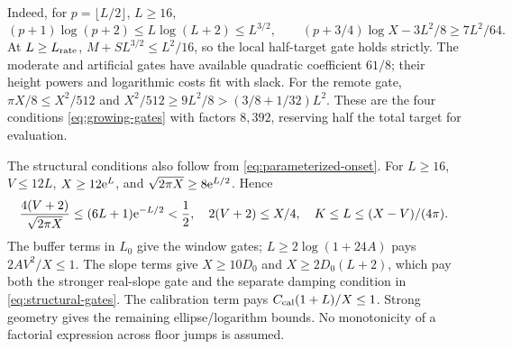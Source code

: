 Indeed, for \(p=\lfloor L/2\rfloor\), \(L\ge16\),
\[
 (p+1)\log(p+2)\le L\log(L+2)\le L^{3/2},\qquad
 (p+3/4)\log X-3L^2/8\ge7L^2/64.
\]
At \(L\ge L_{\rm rate}\), \(M+SL^{3/2}\le L^2/16\),
so the local half-target gate holds strictly.
The moderate and artificial gates have available quadratic coefficient
\(61/8\); their height powers and logarithmic costs fit with slack.
For the remote gate, \(\pi X/8\le X^2/512\) and
\(X^2/512\ge9L^2/8>(3/8+1/32)L^2\).
These are the four conditions \eqref{eq:growing-gates} with factors
\(8,392\), reserving half the total target for evaluation.

The structural conditions also follow from \eqref{eq:parameterized-onset}.
For \(L\ge16\), \(V\le12L\), \(X\ge12\mathrm e^L\), and
\(\sqrt{2\pi X}\ge8\mathrm e^{L/2}\). Hence
\[
 \frac{4(V+2)}{\sqrt{2\pi X}}\le(6L+1)\mathrm e^{-L/2}<\frac12,
 \quad2(V+2)\le X/4,\quad K\le L\le(X-V)/(4\pi).
\]
The buffer terms in \(L_0\) give the window gates;
\(L\ge2\log(1+24A)\) pays \(2AV^2/X\le1\).
The slope terms give \(X\ge10D_0\) and \(X\ge2D_0(L+2)\),
which pay both the stronger real-slope gate and the separate damping
condition in \eqref{eq:structural-gates}.
The calibration term pays \(C_{\rm cal}(1+L)/X\le1\).
Strong geometry gives the remaining ellipse/logarithm bounds.
No monotonicity of a factorial expression across floor jumps is assumed.

